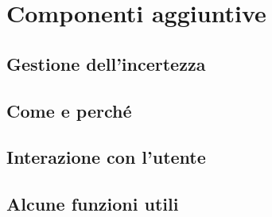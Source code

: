 \section{Componenti aggiuntive}
\subsection{Gestione dell'incertezza}
\subsection{Come e perché}
\subsection{Interazione con l'utente}
\subsection{Alcune funzioni utili}